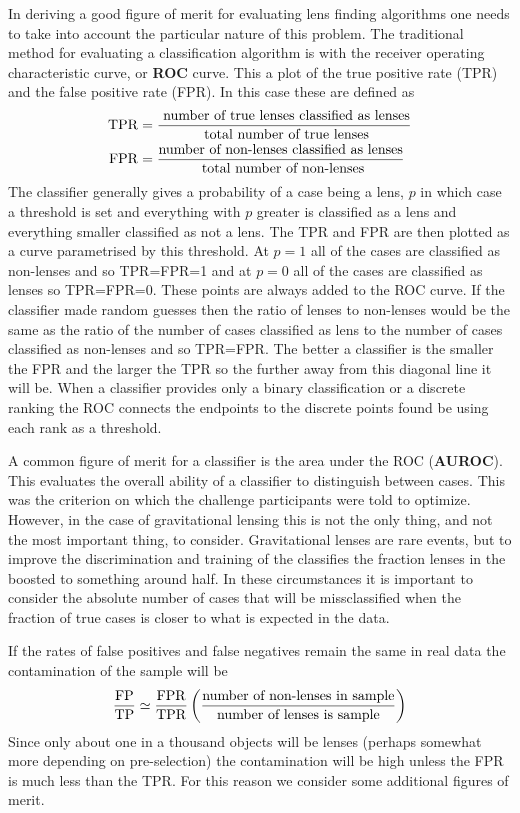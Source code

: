 \documentclass[useAMS,usenatbib]{mn2e}
\begin{document}
In deriving a good figure of merit for evaluating lens finding algorithms one needs to take into account the particular nature of this problem.
The traditional method for evaluating a classification algorithm is with the receiver operating characteristic curve, or {\bf ROC} curve.  This a plot of the true positive rate (TPR) and the false positive rate (FPR).  In this case these are defined as
\begin{align}
{\rm TPR} &= \frac{\textrm{ number of true lenses classified as lenses}}{\textrm{ total number of true lenses}} \\
{\rm FPR} &= \frac{\textrm{number of non-lenses classified as lenses}}{\textrm{ total number of non-lenses}}
\end{align}
The classifier generally gives a probability of a case being a lens, $p$ in which case a threshold is set and everything with $p$ greater is classified as a lens and everything smaller classified as not a lens.  The TPR and FPR are then plotted as a curve parametrised by this threshold.  At $p=1$ all of the cases are classified as non-lenses and so TPR=FPR=1 and at $p=0$ all of the cases are classified as lenses so TPR=FPR=0.  These points are always added to the ROC curve.  If the classifier made random guesses then the ratio of lenses to non-lenses would be the same as the ratio of the number of cases classified as lens to the number of cases classified as non-lenses and so TPR=FPR.  The better a classifier is the smaller the FPR and the larger the TPR so the further away from this diagonal line it will be.  When a classifier provides only a binary classification or a discrete ranking the ROC connects the endpoints to the discrete points found be using each rank as a threshold.

A common figure of merit for a classifier is the area under the ROC ({\bf AUROC}).  This evaluates the overall ability of a classifier to distinguish between cases.  This was the criterion on which the challenge participants were told to optimize.  However, in the case of gravitational lensing this is not the only thing, and not the most important thing, to consider.  Gravitational lenses are rare events, but to improve the discrimination and training of the classifies the fraction lenses in the boosted to something around half.  In these circumstances it is important to consider the absolute number of cases that will be missclassified when the fraction of true cases is closer to what is expected in the data.

If the rates of false positives and false negatives remain the same in real data  the contamination of the sample will be
\begin{align}
\frac{\rm FP}{\rm TP} \simeq \frac{\rm FPR}{\rm TPR} \left(\frac{\textrm{number of non-lenses in sample}}{\textrm{number of lenses is sample}} \right)
\end{align}
Since only about one in a thousand objects will be lenses (perhaps somewhat more depending on pre-selection) the contamination will be high unless the FPR is much less than the TPR.  For this reason we consider some additional figures of merit.
\end{document}

